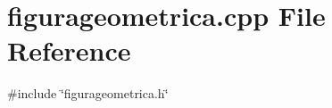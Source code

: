 \section{figurageometrica.\+cpp File Reference}
\label{figurageometrica_8cpp}
{\ttfamily \#include \char`\"{}figurageometrica.\+h\char`\"{}}\newline
